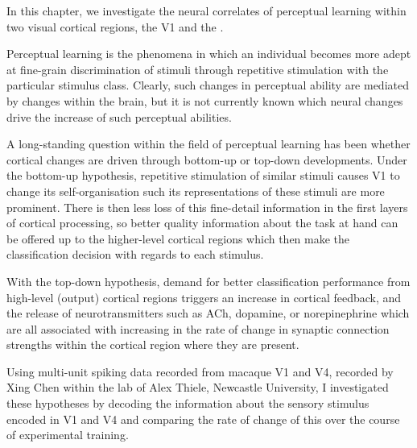 In this chapter, we investigate the neural correlates of perceptual learning within two visual cortical regions, the \acf{V1} and the .

Perceptual learning is the phenomena in which an individual becomes more adept at fine-grain discrimination of stimuli through repetitive stimulation with the particular stimulus class.
Clearly, such changes in perceptual ability are mediated by changes within the brain, but it is not currently known which neural changes drive the increase of such perceptual abilities.

A long-standing question within the field of perceptual learning has been whether cortical changes are driven through bottom-up or top-down developments.
Under the bottom-up hypothesis, repetitive stimulation of similar stimuli causes \ac{V1} to change its self-organisation such its representations of these stimuli are more prominent.
There is then less loss of this fine-detail information in the first layers of cortical processing, so better quality information about the task at hand can be offered up to the higher-level cortical regions which then make the classification decision with regards to each stimulus.

With the top-down hypothesis, demand for better classification performance from high-level (output) cortical regions triggers an increase in cortical feedback, and the release of neurotransmitters such as \ac{ACh}, dopamine, or norepinephrine which are all associated with increasing in the rate of change in synaptic connection strengths within the cortical region where they are present.

Using multi-unit spiking data recorded from macaque \ac{V1} and \ac{V4}, recorded by Xing Chen within the lab of Alex Thiele, Newcastle University, I investigated these hypotheses by decoding the information about the sensory stimulus encoded in \ac{V1} and \ac{V4} and comparing the rate of change of this over the course of experimental training.
